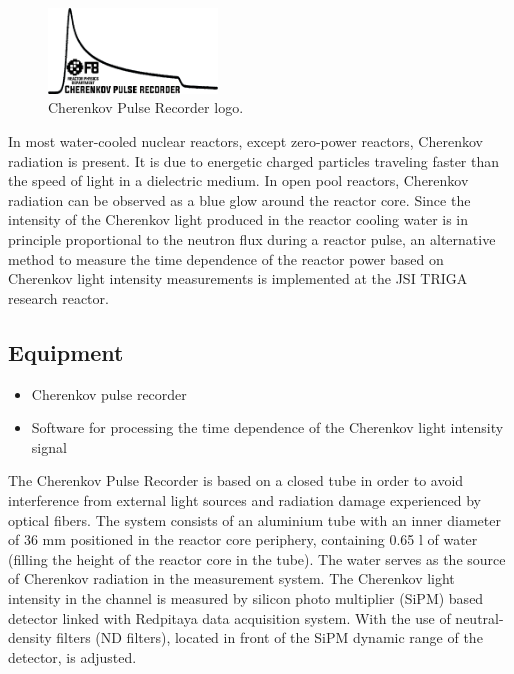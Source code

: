 \documentclass[a4paper,12pt]{article}
\begin{document}
\begin{figure}
	\centering
	\includegraphics[width=0.4\textwidth]{logo.png}
	\caption{Cherenkov Pulse Recorder logo.}
	\label{fig:img1}
\end{figure}

In most water-cooled nuclear reactors, except zero-power reactors, Cherenkov radiation is present. It is due to energetic charged particles traveling faster than the speed of light in a dielectric medium. In open pool reactors, Cherenkov radiation can be observed as a blue glow around the reactor core. Since the intensity of the Cherenkov light produced in the reactor cooling water is in principle proportional to the neutron flux during a reactor pulse, an alternative method to measure the time dependence of the reactor power based on Cherenkov light intensity measurements is implemented at the JSI TRIGA research reactor.

\subsection{Equipment}

\begin{itemize}[noitemsep]
	\item Cherenkov pulse recorder
	\item Software for processing the time dependence of the Cherenkov light intensity signal
\end{itemize}

The Cherenkov Pulse Recorder is based on a closed tube in order to avoid interference from external light sources and radiation damage experienced by optical fibers. The system consists of an aluminium tube with an inner diameter of 36 mm positioned in the reactor core periphery, containing 0.65 l of water (filling the height of the reactor core in the tube). The water serves as the source of Cherenkov radiation in the measurement system. The Cherenkov light intensity in the channel is measured by silicon photo multiplier (SiPM) based detector linked with Redpitaya data acquisition system. With the use of neutral-density filters (ND filters), located in front of the SiPM dynamic range of the detector, is adjusted.
\end{document}
